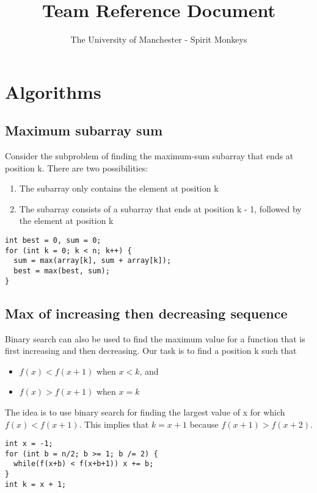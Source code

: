 \documentclass[a4paper]{article}
\title{Team Reference Document}
\author{The University of Manchester - Spirit Monkeys}
\begin{document}
\maketitle
\newpage

\tableofcontents

\section{Algorithms}


\subsection{Maximum subarray sum}
Consider the subproblem of finding the maximum-sum subarray that ends at position k. There are two possibilities:
\begin{enumerate}
  \item The subarray only contains the element at position k
  \item The subarray consists of a subarray that ends at position k - 1, followed by the element at position k
\end{enumerate}
\begin{lstlisting}
int best = 0, sum = 0;
for (int k = 0; k < n; k++) {
  sum = max(array[k], sum + array[k]);
  best = max(best, sum);
}
\end{lstlisting}


\subsection{Max of increasing then decreasing sequence}
Binary search can also be used to find the maximum value for a function that is first increasing and then decreasing. Our task is to find a position k such that
\begin{itemize}
  \item $f(x) < f(x + 1)$ when $x < k$, and
  \item $f(x) > f(x + 1)$ when $x = k$
\end{itemize}
The idea is to use binary search for finding the largest value of x for which $f (x) < f(x + 1)$. This implies that $k = x + 1$ because $f(x + 1) > f(x + 2)$.
\begin{lstlisting}
int x = -1;
for (int b = n/2; b >= 1; b /= 2) {
  while(f(x+b) < f(x+b+1)) x += b;
}
int k = x + 1;
\end{lstlisting}
\end{document}
